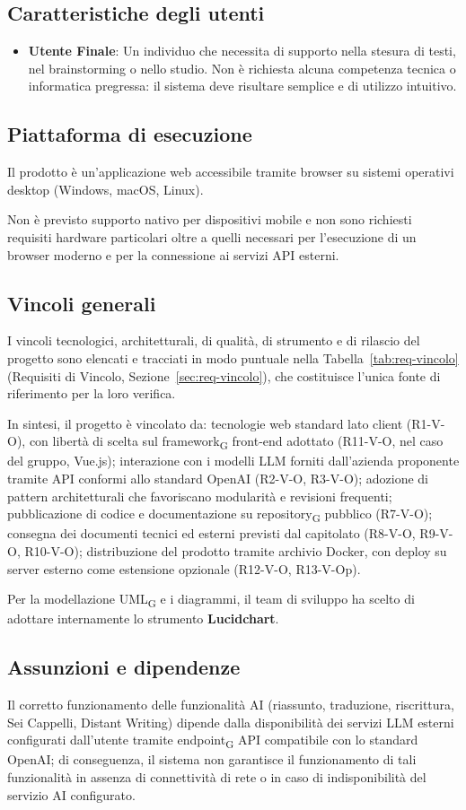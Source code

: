 \subsection{Caratteristiche degli utenti}
\begin{itemize}
	\item \textbf{Utente Finale}: Un individuo che necessita di supporto nella stesura di testi, nel brainstorming o nello studio. Non è richiesta alcuna competenza tecnica o informatica pregressa: il sistema deve risultare semplice e di utilizzo intuitivo.
\end{itemize}

\subsection{Piattaforma di esecuzione}
Il prodotto è un'applicazione web accessibile tramite browser su sistemi operativi desktop (Windows, macOS, Linux). 

Non è previsto supporto nativo per dispositivi mobile e non sono richiesti requisiti hardware particolari oltre a quelli necessari per l'esecuzione di un browser moderno e per la connessione ai servizi API esterni.

\subsection{Vincoli generali}
I vincoli tecnologici, architetturali, di qualità, di strumento e di rilascio del progetto sono elencati e tracciati in modo puntuale nella Tabella~\ref{tab:req-vincolo} (Requisiti di Vincolo, Sezione~\ref{sec:req-vincolo}), che costituisce l'unica fonte di riferimento per la loro verifica.

In sintesi, il progetto è vincolato da: tecnologie web standard lato client (R1-V-O), con libertà di scelta sul framework\textsubscript{G} front-end adottato (R11-V-O, nel caso del gruppo, Vue.js); interazione con i modelli LLM forniti dall'azienda proponente tramite API conformi allo standard OpenAI (R2-V-O, R3-V-O); adozione di pattern architetturali che favoriscano modularità e revisioni frequenti; pubblicazione di codice e documentazione su repository\textsubscript{G} pubblico (R7-V-O); consegna dei documenti tecnici ed esterni previsti dal capitolato (R8-V-O, R9-V-O, R10-V-O); distribuzione del prodotto tramite archivio Docker, con deploy su server esterno come estensione opzionale (R12-V-O, R13-V-Op).

Per la modellazione UML\textsubscript{G} e i diagrammi, il team di sviluppo ha scelto di adottare internamente lo strumento \textbf{Lucidchart}.

\subsection{Assunzioni e dipendenze}
Il corretto funzionamento delle funzionalità AI (riassunto, traduzione, riscrittura, Sei Cappelli, Distant Writing) dipende dalla disponibilità dei servizi LLM esterni configurati dall'utente tramite endpoint\textsubscript{G} API compatibile con lo standard OpenAI; di conseguenza, il sistema non garantisce il funzionamento di tali funzionalità in assenza di connettività di rete o in caso di indisponibilità del servizio AI configurato.